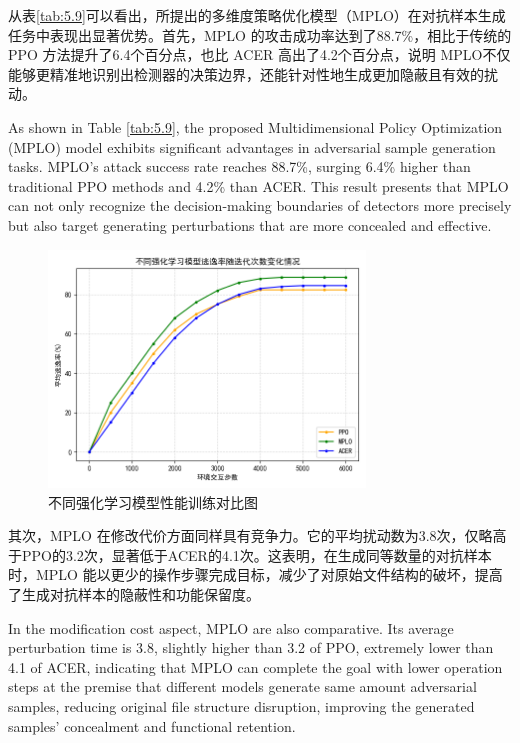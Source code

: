 从表\ref{tab:5.9}可以看出，所提出的多维度策略优化模型（MPLO）在对抗样本生成任务中表现出显著优势。首先，MPLO 的攻击成功率达到了88.7\%，相比于传统的PPO 方法提升了6.4个百分点，也比 ACER 高出了4.2个百分点，说明 MPLO不仅能够更精准地识别出检测器的决策边界，还能针对性地生成更加隐蔽且有效的扰动。

As shown in Table \ref{tab:5.9}, the proposed Multidimensional Policy Optimization (MPLO) model exhibits significant advantages in adversarial sample generation tasks. MPLO's attack success rate reaches 88.7\%, surging 6.4\% higher than traditional PPO methods and 4.2\% than ACER. This result presents that MPLO can not only recognize the decision-making boundaries of detectors more precisely but also target generating perturbations that are more concealed and effective.
\begin{figure}[hbt]
	\centering
	\includegraphics[width=0.75\textwidth]{figures/5.1}
	\caption{不同强化学习模型性能训练对比图}\label{fig:5.1}
\end{figure}

其次，MPLO 在修改代价方面同样具有竞争力。它的平均扰动数为3.8次，仅略高于PPO的3.2次，显著低于ACER的4.1次。这表明，在生成同等数量的对抗样本时，MPLO 能以更少的操作步骤完成目标，减少了对原始文件结构的破坏，提高了生成对抗样本的隐蔽性和功能保留度。

In the modification cost aspect, MPLO are also comparative. Its average perturbation time is 3.8, slightly higher than 3.2 of PPO, extremely lower than 4.1 of ACER, indicating that MPLO can complete the goal with lower operation steps at the premise that different models generate same amount adversarial samples, reducing original file structure disruption, improving the generated samples' concealment and functional retention.

